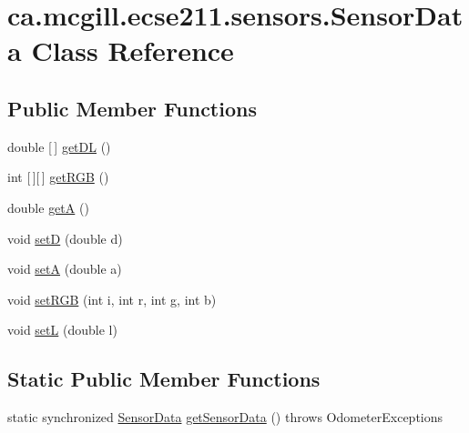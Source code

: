 \hypertarget{classca_1_1mcgill_1_1ecse211_1_1sensors_1_1_sensor_data}{}\section{ca.\+mcgill.\+ecse211.\+sensors.\+Sensor\+Data Class Reference}
\label{classca_1_1mcgill_1_1ecse211_1_1sensors_1_1_sensor_data}
\subsection*{Public Member Functions}
\begin{DoxyCompactItemize}
\item 
double \mbox{[}$\,$\mbox{]} \hyperlink{classca_1_1mcgill_1_1ecse211_1_1sensors_1_1_sensor_data_a4e0eabd547726c90bd0b7252557d7ad7}{get\+DL} ()
\item 
int \mbox{[}$\,$\mbox{]}\mbox{[}$\,$\mbox{]} \hyperlink{classca_1_1mcgill_1_1ecse211_1_1sensors_1_1_sensor_data_a0abd08431dae67c7ee0e7a18b5305f91}{get\+R\+GB} ()
\item 
double \hyperlink{classca_1_1mcgill_1_1ecse211_1_1sensors_1_1_sensor_data_a7ad543db5c907b4bd3329dbb34b4e9d9}{getA} ()
\item 
void \hyperlink{classca_1_1mcgill_1_1ecse211_1_1sensors_1_1_sensor_data_ae20bf127c57dcfcb3b7632ca05b6d482}{setD} (double d)
\item 
void \hyperlink{classca_1_1mcgill_1_1ecse211_1_1sensors_1_1_sensor_data_a9828d8b4dfb9b197e8fd149fb7deb63b}{setA} (double a)
\item 
void \hyperlink{classca_1_1mcgill_1_1ecse211_1_1sensors_1_1_sensor_data_ae5e2528566b53218673ebc1ae4683204}{set\+R\+GB} (int i, int r, int g, int b)
\item 
void \hyperlink{classca_1_1mcgill_1_1ecse211_1_1sensors_1_1_sensor_data_aeafd49ce71819e8e1a5d5ff6287e7819}{setL} (double l)
\end{DoxyCompactItemize}
\subsection*{Static Public Member Functions}
\begin{DoxyCompactItemize}
\item 
static synchronized \hyperlink{classca_1_1mcgill_1_1ecse211_1_1sensors_1_1_sensor_data}{Sensor\+Data} \hyperlink{classca_1_1mcgill_1_1ecse211_1_1sensors_1_1_sensor_data_ab8aef4bdb5d9f3dad399656e00af2539}{get\+Sensor\+Data} ()  throws Odometer\+Exceptions 
\end{DoxyCompactItemize}
